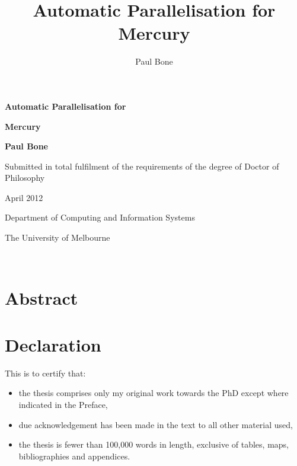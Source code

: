 \documentclass[a4paper,twoside]{report}
\title{Automatic Parallelisation for Mercury}
\author{Paul Bone}
\begin{document}
\begin{titlepage}
\begin{center}
\vspace*{3cm}
{\Huge \textbf{Automatic Parallelisation for}} \par
\vspace*{1em}
{\Huge \textbf{Mercury}} \par
\vspace*{2cm}
{\huge \textbf{Paul Bone}} \par
\vspace*{4cm}
{\Large Submitted in total fulfilment of the requirements of the degree of
        Doctor of Philosophy} \par
\vspace*{1cm}
{\Large April 2012} \par
\vspace*{1cm}
{\Large Department of Computing and Information Systems} \par
{\Large The University of Melbourne} \par
\end{center}

\\
\end{titlepage}

\chapter*{Abstract}


\chapter*{Declaration}


This is to certify that:

\begin{itemize}

    \item the thesis comprises only my original work towards the PhD except
          where indicated in the Preface,

    \item due acknowledgement has been made in the text to all other material
          used,

    \item the thesis is fewer than 100,000 words in length, exclusive of
          tables, maps, bibliographies and appendices.

\end{itemize}
\end{document}
